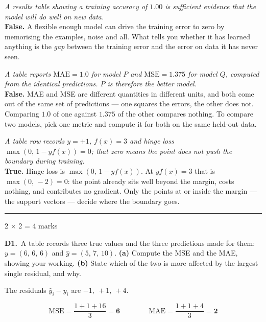 \documentclass[10pt,a4paper]{article}
\newcommand{\parthead}[2]{\vspace{2pt}\noindent\rule{\linewidth}{0.4pt}\par\vspace{2pt}%
  \noindent{\bfseries Part #1}\hfill{\small #2}\par\vspace{1pt}}
\newcommand{\sol}[1]{\textbf{#1}}
\begin{document}
\begin{sC}

  \item \emph{A results table showing a training accuracy of $1.00$ is sufficient evidence that the model will do well on new data.}\\[2pt] \textbf{False.} A flexible enough model can drive the training error to zero by memorising the examples, noise and all. What tells you whether it has learned anything is the \emph{gap} between the training error and the error on data it has never seen.

  \item \emph{A table reports $\mathrm{MAE} = 1.0$ for model $P$ and $\mathrm{MSE} = 1.375$ for model $Q$, computed from the identical predictions. $P$ is therefore the better model.}\\[2pt] \textbf{False.} MAE and MSE are different quantities in different units, and both come out of the same set of predictions --- one squares the errors, the other does not. Comparing $1.0$ of one against $1.375$ of the other compares nothing. To compare two models, pick one metric and compute it for both on the same held-out data.

  \item \emph{A table row records $y = +1$, $f(x) = 3$ and hinge loss $\max(0,\,1 - y f(x)) = 0$; that zero means the point does not push the boundary during training.}\\[2pt] \textbf{True.} Hinge loss is $\max(0,\,1 - y f(x))$. At $y f(x) = 3$ that is $\max(0,\,-2) = 0$: the point already sits well beyond the margin, costs nothing, and contributes no gradient. Only the points at or inside the margin --- the support vectors --- decide where the boundary goes.

\end{sC}

\newpage

\parthead{D --- Short answer}{2 $\times$ 2 = 4 marks}

\textbf{D1.}\ A table records three true values and the three predictions made for them: $y = (6,\,6,\,6)$ and $\hat{y} = (5,\,7,\,10)$. \textbf{(a)} Compute the MSE and the MAE, showing your working. \textbf{(b)} State which of the two is more affected by the largest single residual, and why.

\vspace{2pt}

The residuals $\hat y_i - y_i$ are $-1,\ +1,\ +4$.

\[ \mathrm{MSE} = \frac{1 + 1 + 16}{3} = \sol{6} \qquad\qquad \mathrm{MAE} = \frac{1 + 1 + 4}{3} = \sol{2} \]
\end{document}
